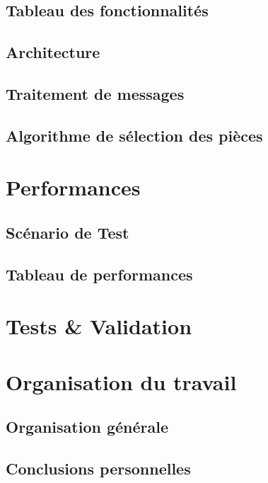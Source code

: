 \documentclass{article}
\begin{document}
    \subsection{Tableau des fonctionnalités}
    \subsection{Architecture}
    \subsection{Traitement de messages}
    \subsection{Algorithme de sélection des pièces}

\section{Performances}
    \subsection{Scénario de Test}
    \subsection{Tableau de performances}

\section{Tests \& Validation}

\section{Organisation du travail}
    \subsection{Organisation générale}
    \subsection{Conclusions personnelles}
\end{document}
